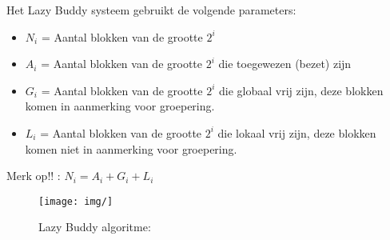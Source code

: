 Het Lazy Buddy systeem gebruikt de volgende parameters:

\begin{itemize}
\item $N_i$ = Aantal blokken van de grootte $2^i$
\item $A_i$ = Aantal blokken van de grootte $2^i$ die toegewezen (bezet) zijn
\item $G_i$ = Aantal blokken van de grootte $2^i$ die globaal vrij zijn, deze blokken komen in aanmerking voor groepering.
\item $L_i$ = Aantal blokken van de grootte $2^i$ die lokaal vrij zijn, deze blokken komen niet in aanmerking voor groepering.
\end{itemize}
Merk op!! : $N_i = A_i + G_i  + L_i$

\begin{figure}[htp]
    \centering
            \texttt{[image: img/]}
        \caption{Lazy Buddy algoritme:}
    \label{fig:Lazy Buddy algoritme:}
\end{figure}